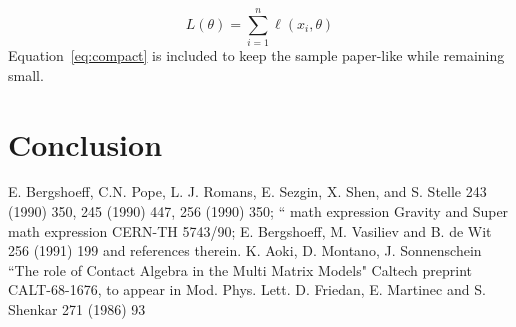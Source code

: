 \documentclass[11pt]{article}
\begin{document}
\begin{equation}
\label{eq:compact}
L(\theta) = \sum_{i=1}^{n} \ell(x_i, \theta)
\end{equation}
Equation~\ref{eq:compact} is included to keep the sample paper-like while remaining small.

\section{Conclusion}

E. Bergshoeff, C.N. Pope, L. J. Romans, E. Sezgin, X. Shen, and S. Stelle 243 (1990) 350, 245 (1990) 447, 256 (1990) 350; `` math expression Gravity and Super math expression CERN-TH 5743/90; E. Bergshoeff, M. Vasiliev and B. de Wit 256 (1991) 199 and references therein. K. Aoki, D. Montano, J. Sonnenschein ``The role of Contact Algebra in the Multi Matrix Models" Caltech preprint CALT-68-1676, to appear in Mod. Phys. Lett. D. Friedan, E. Martinec and S. Shenkar 271 (1986) 93
\end{document}
